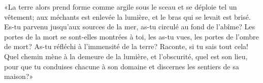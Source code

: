 «La terre alors prend forme comme argile sous le sceau et se déploie tel un vêtement;
	aux méchants est enlevée la lumière, et le bras qui se levait est brisé.
Es-tu parvenu jusqu’aux sources de la mer, as-tu circulé au fond de l’abîme?
Les portes de la mort se sont-elles montrées à toi,
	les as-tu vues, les portes de l’ombre de mort?
As-tu réfléchi à l’immensité de la terre?
Raconte, si tu sais tout cela!
Quel chemin mène à la demeure de la lumière, et l’obscurité, quel est son lieu,
	pour que tu conduises chacune à son domaine et discernes les sentiers de sa maison?»

